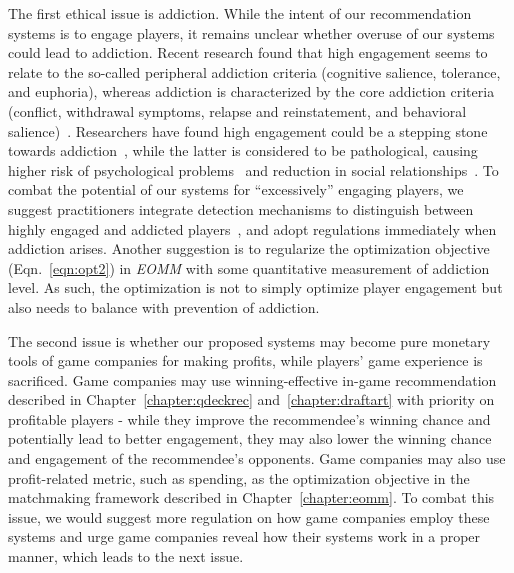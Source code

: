 
The first ethical issue is addiction. While the intent of our recommendation systems is to engage players, it remains unclear whether overuse of our systems could lead to addiction. Recent research found that high engagement seems to relate to the so-called peripheral addiction criteria (cognitive salience, tolerance, and euphoria), whereas addiction is characterized by the core addiction criteria (conflict, withdrawal symptoms, relapse and reinstatement, and behavioral salience)~\citep{charlton2007distinguishing}. Researchers have found high engagement could be a stepping stone towards addiction~\citep{charlton2007distinguishing}, while the latter is considered to be pathological, causing higher risk of psychological problems~\citep{lehenbauer2015addiction,brunborg2013gaming} and reduction in social relationships~\citep{kraut2002internet,blais2008adolescents}. To combat the potential of our systems for ``excessively'' engaging players, we suggest practitioners integrate detection mechanisms to distinguish between highly engaged and addicted players~\citep{charlton2007distinguishing,fisher1994identifying,griffiths1998dependence,brown1997theoretical,griffiths1996behavioural,seok2014distinguishing}, and adopt regulations immediately when addiction arises. Another suggestion is to regularize the optimization objective (Eqn.~\ref{eqn:opt2}) in \textit{EOMM} with some quantitative measurement of addiction level. As such, the optimization is not to simply optimize player engagement but also needs to balance with prevention of addiction.

The second issue is whether our proposed systems may become pure monetary tools of game companies for making profits, while players' game experience is sacrificed. Game companies may use winning-effective in-game recommendation described in Chapter~\ref{chapter:qdeckrec} and~\ref{chapter:draftart} with priority on profitable players - while they improve the recommendee's winning chance and potentially lead to better engagement, they may also lower the winning chance and engagement of the recommendee's opponents. Game companies may also use profit-related metric, such as spending, as the optimization objective in the matchmaking framework described in Chapter~\ref{chapter:eomm}. To combat this issue, we would suggest more regulation on how game companies employ these systems and urge game companies reveal how their systems work in a proper manner, which leads to the next issue.

